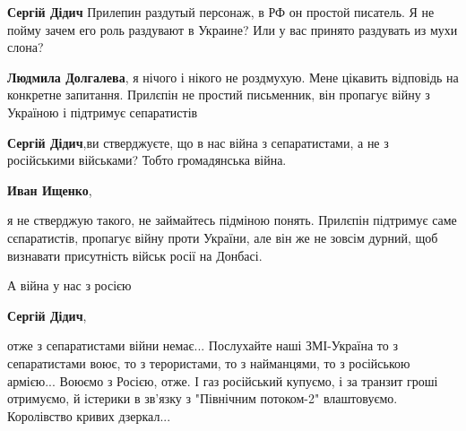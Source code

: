 \begin{itemize}
\begin{itemize}
 
\textbf{Сергій Дідич} Прилепин раздутый персонаж, в РФ он простой писатель. Я не пойму зачем его роль раздувают в Украине? Или у вас принято раздувать из мухи слона?

 
\textbf{Людмила Долгалева}, я нічого і нікого не роздмухую. Мене цікавить відповідь на конкретне запитання.
Прилєпін не простий письменник, він пропагує війну з Україною і підтримує сепаратистів

 
\textbf{Сергій Дідич},ви стверджуєте, що в нас війна з сепаратистами, а не з російськими військами? Тобто громадянська війна.

 
\textbf{Иван Ищенко}, 

я не стверджую такого, не займайтесь підміною понять. Прилєпін підтримує саме
сєпаратистів, пропагує війну проти України, але він же не зовсім дурний, щоб
визнавати присутність військ росії на Донбасі.

А війна у нас з росією

 
\textbf{Сергій Дідич},

отже з сепаратистами війни немає... Послухайте наші ЗМІ-Україна то з
сепаратистами воює, то з терористами, то з найманцями, то з російською армією...
Воюємо з Росією, отже. І газ російський купуємо, і за транзит гроші отримуємо, й
істерики в зв'язку з "Північним потоком-2" влаштовуємо. Королівство кривих
дзеркал...


\end{itemize}
\end{itemize}
